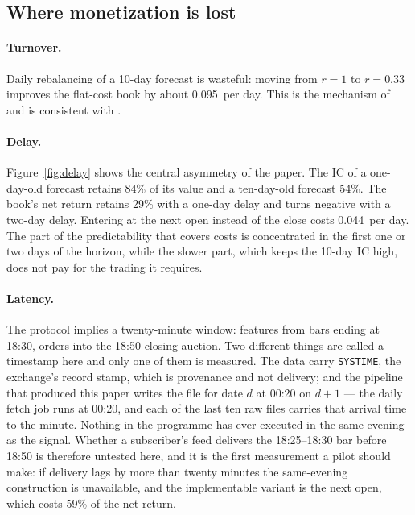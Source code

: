 

\subsection{Where monetization is lost}

\paragraph{Turnover.} Daily rebalancing of a 10-day forecast is wasteful: moving from $r=1$ to $r=0.33$ improves the flat-cost book by about 0.095\pp\ per day. This is the mechanism of \citet{garleanu2013} and is consistent with \citet{novymarx2016}.

\paragraph{Delay.} Figure~\ref{fig:delay} shows the central asymmetry of the paper. The IC of a one-day-old forecast retains 84\% of its value and a ten-day-old forecast 54\%. The book's net return retains 29\% with a one-day delay and turns negative with a two-day delay. Entering at the next open instead of the close costs 0.044\pp\ per day. The part of the predictability that covers costs is concentrated in the first one or two days of the horizon, while the slower part, which keeps the 10-day IC high, does not pay for the trading it requires.



\paragraph{Latency.} The protocol implies a twenty-minute window: features from bars ending at 18:30, orders into the 18:50 closing auction. Two different things are called a timestamp here and only one of them is measured. The data carry \texttt{SYSTIME}, the exchange's record stamp, which is provenance and not delivery; and the pipeline that produced this paper writes the file for date $d$ at 00:20 on $d+1$ --- the daily fetch job runs at 00:20, and each of the last ten raw files carries that arrival time to the minute. Nothing in the programme has ever executed in the same evening as the signal. Whether a subscriber's feed delivers the 18:25--18:30 bar before 18:50 is therefore untested here, and it is the first measurement a pilot should make: if delivery lags by more than twenty minutes the same-evening construction is unavailable, and the implementable variant is the next open, which costs 59\% of the net return.

